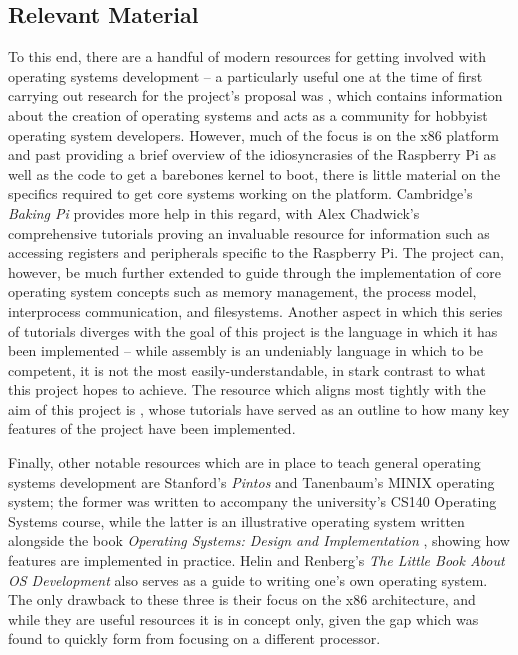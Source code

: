 \subsection{Relevant Material}
    To this end, there are a handful of modern resources for getting involved
    with operating systems development -- a particularly useful one at the time
    of first carrying out research for the project's proposal was
    , which contains information about the creation of
    operating systems and acts as a community for hobbyist operating system
    developers. However, much of the focus is on the x86 platform and past
    providing a brief overview of the idiosyncrasies of the Raspberry Pi as well
    as the code to get a barebones kernel to boot, there is little material on
    the specifics required to get core systems working on the platform.
    Cambridge's \textit{Baking Pi} \cite{BakingPi} provides more help in this
    regard, with Alex Chadwick's comprehensive tutorials proving an invaluable
    resource for information such as accessing registers and peripherals
    specific to the Raspberry Pi. The project can, however, be much further
    extended to guide through the implementation of core operating system
    concepts such as memory management, the process model, interprocess
    communication, and filesystems. Another aspect in which this series of
    tutorials diverges with the goal of this project is the language in which it
    has been implemented -- while assembly is an undeniably language in which to
    be competent, it is not the most easily-understandable, in stark contrast to
    what this project hopes to achieve. The resource which aligns most tightly
    with the aim of this project is \cite{jsandler}, whose tutorials have served
    as an outline to how many key features of the project have been implemented.
    
    Finally, other notable resources which are in place to teach general
    operating systems development are Stanford's \textit{Pintos} \cite{Pintos}
    and Tanenbaum's MINIX operating system; the former was written to accompany
    the university's CS140 Operating Systems course, while the latter is an
    illustrative operating system written alongside the book \textit{Operating
    Systems: Design and Implementation} \cite{MINIX}, showing how features are
    implemented in practice. Helin and Renberg's \textit{The Little Book About
    OS Development} \cite{littleosbook} also serves as a guide to writing one's
    own operating system. The only drawback to these three is their focus on the
    x86 architecture, and while they are useful resources it is in concept only,
    given the gap which was found to quickly form from focusing on a different
    processor.

